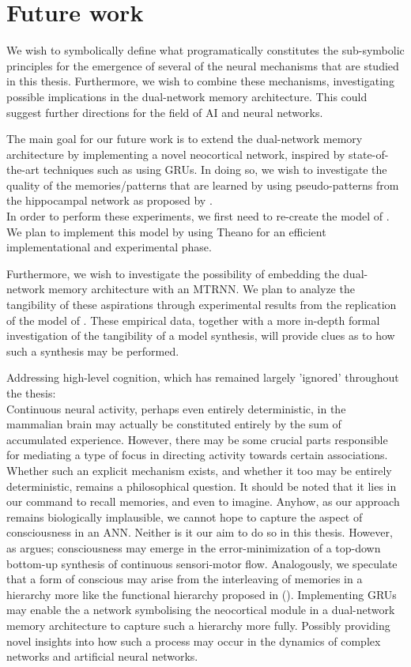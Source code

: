 \section{Future work}\label{future_work}

We wish to symbolically define what programatically constitutes the sub-symbolic principles for the emergence of several of the neural mechanisms that are studied in this thesis. Furthermore, we wish to combine these mechanisms, investigating possible implications in the dual-network memory architecture. This could suggest further directions for the field of AI and neural networks.

The main goal for our future work is to extend the dual-network memory architecture by implementing a novel neocortical network, inspired by state-of-the-art techniques such as using GRUs. In doing so, we wish to investigate the quality of the memories/patterns that are learned by using pseudo-patterns from the hippocampal network as proposed by \cite{Hattori2014}.
\\
In order to perform these experiments, we first need to re-create the model of \cite{Hattori2014}. We plan to implement this model by using Theano for an efficient implementational and experimental phase.

Furthermore, we wish to investigate the possibility of embedding the dual-network memory architecture with an MTRNN. We plan to analyze the tangibility of these aspirations through experimental results from the replication of the model of \cite{Hattori2014}. These empirical data, together with a more in-depth formal investigation of the tangibility of a model synthesis, will provide clues as to how such a synthesis may be performed.

Addressing high-level cognition, which has remained largely 'ignored' throughout the thesis:
\\
Continuous neural activity, perhaps even entirely deterministic, in the mammalian brain may actually be constituted entirely by the sum of accumulated experience. However, there may be some crucial parts responsible for mediating a type of focus in directing activity towards certain associations. Whether such an explicit mechanism exists, and whether it too may be entirely deterministic, remains a philosophical question. It should be noted that it lies in our command to recall memories, and even to imagine.
Anyhow, as our approach remains biologically implausible, we cannot hope to capture the aspect of consciousness in an ANN. Neither is it our aim to do so in this thesis. However, as \cite{Tani2014} argues; consciousness may emerge in the error-minimization of a top-down bottom-up synthesis of continuous sensori-motor flow. Analogously, we speculate that a form of conscious may arise from the interleaving of memories in a hierarchy more like the functional hierarchy proposed in (\cite{Yamashita2008, Tani2014}). Implementing GRUs may enable the a network symbolising the neocortical module in a dual-network memory architecture to capture such a hierarchy more fully. Possibly providing novel insights into how such a process may occur in the dynamics of complex networks and artificial neural networks.

